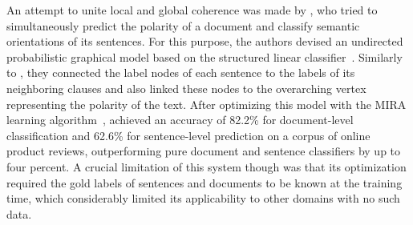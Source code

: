 \documentclass[11pt]{article}
\begin{document}



An attempt to unite local and global coherence was made by
, who tried to simultaneously predict the polarity
of a document and classify semantic orientations of its sentences.
For this purpose, the authors devised an undirected probabilistic
graphical model based on the structured linear
classifier~\cite{Collins:02}.  Similarly to , they
connected the label nodes of each sentence to the labels of its
neighboring clauses and also linked these nodes to the overarching
vertex representing the polarity of the text.  After optimizing this
model with the MIRA learning algorithm~\cite{Crammer:03},
 achieved an accuracy of 82.2\% for
document-level classification and 62.6\% for sentence-level prediction
on a corpus of online product reviews, outperforming pure document and
sentence classifiers by up to four percent.  A crucial limitation of
this system though was that its optimization required the gold labels
of sentences and documents to be known at the training time, which
considerably limited its applicability to other domains with no such
data.

\end{document}
